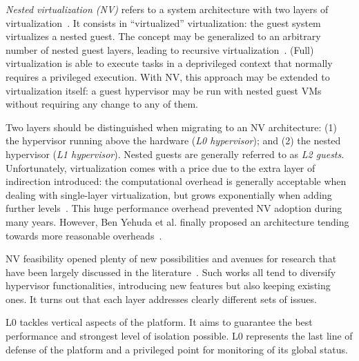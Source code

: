 \documentclass{sig-alternate}
\begin{document}
\noindent \textit{Nested virtualization (NV)} refers to a system architecture with two layers of virtualization~\cite{turtle:ibm}. It consists in ``virtualized'' virtualization: the guest system virtualizes a nested guest. The concept may be generalized to an arbitrary number of nested guest layers, leading to recursive virtualization~\cite{rec:virt,Popek:1974:FRV:361011.361073}. (Full) virtualization is able to execute tasks in a deprivileged context that normally requires a privileged execution. With NV, this approach may be extended to virtualization itself: a guest hypervisor may be run with nested guest VMs without requiring any change to any of them.

Two layers should be distinguished when migrating to an NV architecture: (1) the hypervisor running above the hardware (\textit{L0 hypervisor}); and (2) the nested hypervisor (\textit{L1 hypervisor}). Nested guests are generally referred to as \textit{L2 guests}.
Unfortunately, virtualization comes with a price due to the extra layer of indirection introduced: the computational overhead is generally acceptable when dealing with single-layer virtualization, but grows exponentially when adding further levels~\cite{rec:virt}. This huge performance overhead prevented NV adoption during many years. However, Ben Yehuda et al. finally proposed an architecture tending towards more reasonable overheads~\cite{turtle:ibm}.

NV feasibility opened plenty of new possibilities and avenues for research that have been largely discussed in the literature~\cite{turtle:ibm,rec:virt,art:blan}. Such works all tend to diversify hypervisor functionalities, introducing new features but also keeping existing ones. It turns out that each layer addresses clearly different sets of issues.

L0 tackles vertical aspects of the platform. It aims to guarantee the best performance and strongest level of isolation possible. L0 represents the last line of defense of the platform and a privileged point for monitoring of its global status.
\end{document}
